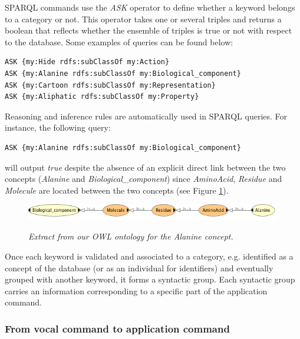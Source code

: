 \documentclass{vgtc}                          %
\begin{document}
SPARQL commands use the \textit{ASK} operator to define whether a keyword belongs to a category or not. This operator takes one or several triples and returns a boolean that reflects whether the ensemble of triples is true or not with respect to the database. Some examples of queries can be found below:

\begin{lstlisting}[language=XML]
ASK {my:Hide rdfs:subClassOf my:Action}
ASK {my:Alanine rdfs:subClassOf my:Biological_component}
ASK {my:Cartoon rdfs:subClassOf my:Representation}
ASK {my:Aliphatic rdfs:subClassOf my:Property}
\end{lstlisting}

Reasoning and inference rules are automatically used in SPARQL queries. For instance, the following query:

\begin{lstlisting}[language=XML]
ASK {my:Alanine rdfs:subClassOf my:Biological_component}
\end{lstlisting}
\noindent
will output \textit{true} despite the absence of an explicit direct link between the two concepts (\textit{Alanine} and \textit{Biological\_component}) since \textit{AminoAcid}, \textit{Residue} and \textit{Molecule} are located between the two concepts (see Figure \ref{Fig:alanine_owl}).

\hspace{1cm}

\begin{figure}[!htb]
  \centering
  {\includegraphics[width=\linewidth]{./figures/alanine_to_bio_component_owl}}
    \caption[Extract from OWL ontology for the \textit{Alanine} concept.]{\it Extract from our OWL ontology for the \textit{Alanine} concept.}
  \label{Fig:alanine_owl}
\end{figure}

Once each keyword is validated and associated to a category, e.g. identified as a concept of the database (or as an individual for identifiers) and eventually grouped with another keyword, it forms a syntactic group. Each syntactic group carries an information corresponding to a specific part of the application command.

\subsubsection{From vocal command to application command}
\end{document}
